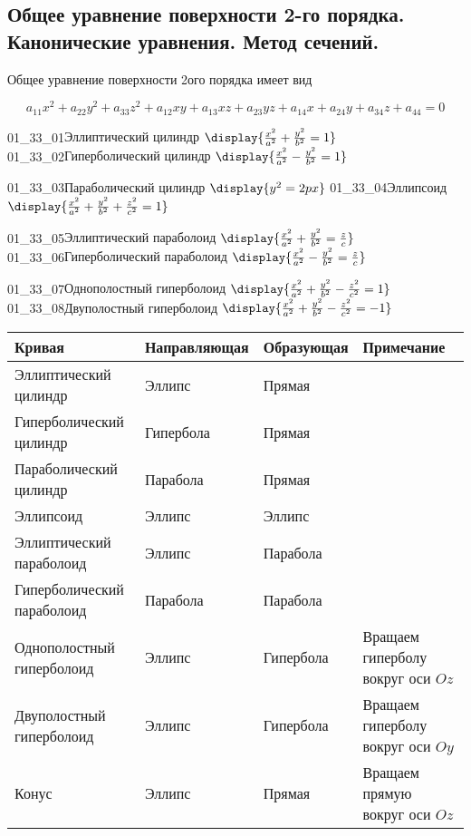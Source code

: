 \subsection{%
  Общее уравнение поверхности 2-го порядка. Канонические уравнения. Метод
  сечений.%
}
 
Общее уравнение поверхности 2ого порядка имеет вид

\begin{equation*}
  a_{11} x^2 + a_{22} y^2 + a_{33} z^2
  + a_{12} xy + a_{13} xz + a_{23} yz
  + a_{14} x + a_{24} y + a_{34} z + a_{44}
  = 0
\end{equation*}

\gallerydouble
  {01_33_01}{Эллиптический цилиндр \(\display{
    \frac{x^2}{a^2} + \frac{y^2}{b^2} = 1
  }\)}
  {01_33_02}{Гиперболический цилиндр \(\display{
    \frac{x^2}{a^2} - \frac{y^2}{b^2} = 1
  }\)}

\gallerydouble
  {01_33_03}{Параболический цилиндр \(\display{
    y^2 = 2px
  }\)}
  {01_33_04}{Эллипсоид \(\display{
    \frac{x^2}{a^2} + \frac{y^2}{b^2} + \frac{z^2}{c^2} = 1
  }\)}

\gallerydouble
  {01_33_05}{Эллиптический параболоид \(\display{
    \frac{x^2}{a^2} + \frac{y^2}{b^2} = \frac{z}{c}
  }\)}
  {01_33_06}{Гиперболический параболоид \(\display{
    \frac{x^2}{a^2} - \frac{y^2}{b^2} = \frac{z}{c}
  }\)}

\gallerydouble
  {01_33_07}{Однополостный гиперболоид \(\display{
    \frac{x^2}{a^2} + \frac{y^2}{b^2} - \frac{z^2}{c^2} = 1
  }\)}
  {01_33_08}{Двуполостный гиперболоид \(\display{
    \frac{x^2}{a^2} + \frac{y^2}{b^2} - \frac{z^2}{c^2} = -1
  }\)}


\begin{table}
  \setlength{\tabcolsep}{10pt}
  \renewcommand{\arraystretch}{1.5}

  \begin{tabular}{l|l|l|l}
    Кривая & Направляющая & Образующая & Примечание
  \\ \hline
    Эллиптический цилиндр & Эллипс & Прямая &
  \\
    Гиперболический цилиндр & Гипербола & Прямая &
  \\
    Параболический цилиндр & Парабола & Прямая &
  \\
    Эллипсоид & Эллипс & Эллипс &
  \\
    Эллиптический параболоид & Эллипс & Парабола &
  \\
    Гиперболический параболоид & Парабола & Парабола &
  \\
    Однополостный гиперболоид & Эллипс & Гипербола &
      Вращаем гиперболу вокруг оси \(Oz\)
  \\
    Двуполостный гиперболоид & Эллипс & Гипербола &
      Вращаем гиперболу вокруг оси \(Oy\)
  \\
    Конус & Эллипс & Прямая &
      Вращаем прямую вокруг оси \(Oz\)
  \end{tabular}  
\end{table}

